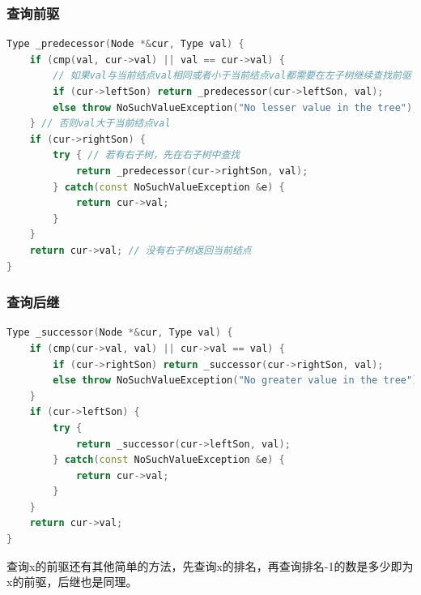 \documentclass[utf8]{ctexbeamer}
\begin{document}
    \begin{frame}[fragile]
        \frametitle{查询前驱}
        \begin{lstlisting}[language=c++]
Type _predecessor(Node *&cur, Type val) {
    if (cmp(val, cur->val) || val == cur->val) { 
        // 如果val与当前结点val相同或者小于当前结点val都需要在左子树继续查找前驱
        if (cur->leftSon) return _predecessor(cur->leftSon, val);
        else throw NoSuchValueException("No lesser value in the tree");
    } // 否则val大于当前结点val
    if (cur->rightSon) { 
        try { // 若有右子树，先在右子树中查找
            return _predecessor(cur->rightSon, val);
        } catch(const NoSuchValueException &e) {
            return cur->val;
        }
    }
    return cur->val; // 没有右子树返回当前结点
}
        \end{lstlisting}
    \end{frame}

    \begin{frame}[fragile]
        \frametitle{查询后继}
        \begin{lstlisting}[language=c++]
Type _successor(Node *&cur, Type val) {
    if (cmp(cur->val, val) || cur->val == val) {
        if (cur->rightSon) return _successor(cur->rightSon, val);
        else throw NoSuchValueException("No greater value in the tree");
    }
    if (cur->leftSon) {
        try {
            return _successor(cur->leftSon, val);
        } catch(const NoSuchValueException &e) {
            return cur->val;
        }
    }
    return cur->val;
}
        \end{lstlisting}
        查询x的前驱还有其他简单的方法，先查询x的排名，再查询排名-1的数是多少即为x的前驱，后继也是同理。
    \end{frame}
\end{document}
